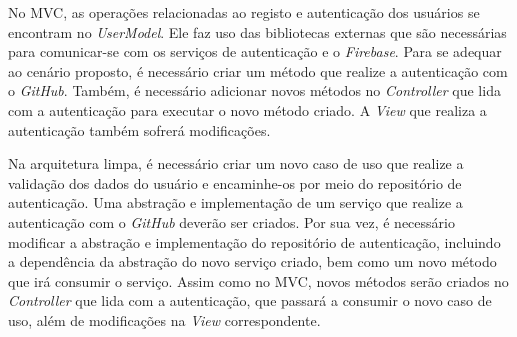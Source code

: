 No MVC, as operações relacionadas ao registo e autenticação dos usuários se encontram no \emph{UserModel}.
Ele faz uso das bibliotecas externas que são necessárias para comunicar-se com os serviços de autenticação e o \emph{Firebase}.
Para se adequar ao cenário proposto, é necessário criar um método que realize a autenticação com o \emph{GitHub}.
Também, é necessário adicionar novos métodos no \emph{Controller} que lida com a autenticação para executar o novo método criado.
A \emph{View} que realiza a autenticação também sofrerá modificações.

Na arquitetura limpa, é necessário criar um novo caso de uso que realize a validação dos dados do usuário e encaminhe-os por meio do repositório de autenticação.
Uma abstração e implementação de um serviço que realize a autenticação com o \emph{GitHub} deverão ser criados.
Por sua vez, é necessário modificar a abstração e implementação do repositório de autenticação, incluindo a dependência da abstração do novo serviço criado, bem como um novo método que irá consumir o serviço.
Assim como no MVC, novos métodos serão criados no \emph{Controller} que lida com a autenticação, que passará a consumir o novo caso de uso, além de modificações na \emph{View} correspondente.